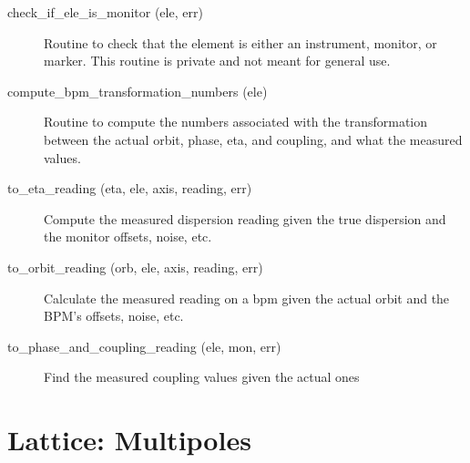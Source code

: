\begin{description}

\item[check_if_ele_is_monitor (ele, err)] \Newline
Routine to check that the element is either an instrument, monitor, or marker.
This routine is private and not meant for general use.

\item[compute_bpm_transformation_numbers (ele)] \Newline
Routine to compute the numbers associated with the transformation between
the actual orbit, phase, eta, and coupling, and what the measured values.

\item[to_eta_reading (eta, ele, axis, reading, err)] \Newline
Compute the measured dispersion reading given the true dispersion and the
monitor offsets, noise, etc.

\item[to_orbit_reading (orb, ele, axis, reading, err)] \Newline
Calculate the measured reading on a bpm given the actual orbit and the
BPM's offsets, noise, etc.

\item[to_phase_and_coupling_reading (ele, mon, err)] \Newline
Find the measured coupling values given the actual ones


\end{description}

\section{Lattice: Multipoles}
\label{r:multi}    

